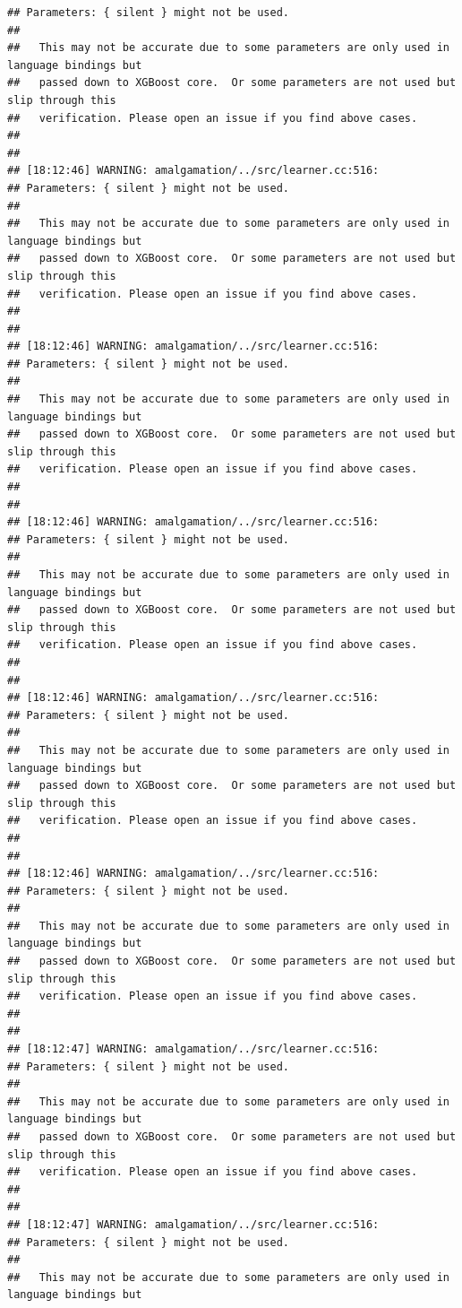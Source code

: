 \documentclass[AMS,STIX2COL]{WileyNJD-v2}\usepackage[]{graphicx}\usepackage[]{color}
\makeatletter
\newenvironment{kframe}{%
 \def\at@end@of@kframe{}%
 \ifinner\ifhmode%
  \def\at@end@of@kframe{\end{minipage}}%
  \begin{minipage}{\columnwidth}%
 \fi\fi%
 \def\FrameCommand##1{\hskip\@totalleftmargin \hskip-\fboxsep
 \colorbox{shadecolor}{##1}\hskip-\fboxsep
     \hskip-\linewidth \hskip-\@totalleftmargin \hskip\columnwidth}%
 \MakeFramed {\advance\hsize-\width
   \@totalleftmargin\z@ \linewidth\hsize
   \@setminipage}}%
 {\par\unskip\endMakeFramed%
 \at@end@of@kframe}
\newenvironment{knitrout}{}{} %
\makeatother
\begin{document}
\begin{knitrout}
\begin{kframe}
\begin{verbatim}
## Parameters: { silent } might not be used.
## 
##   This may not be accurate due to some parameters are only used in language bindings but
##   passed down to XGBoost core.  Or some parameters are not used but slip through this
##   verification. Please open an issue if you find above cases.
## 
## 
## [18:12:46] WARNING: amalgamation/../src/learner.cc:516: 
## Parameters: { silent } might not be used.
## 
##   This may not be accurate due to some parameters are only used in language bindings but
##   passed down to XGBoost core.  Or some parameters are not used but slip through this
##   verification. Please open an issue if you find above cases.
## 
## 
## [18:12:46] WARNING: amalgamation/../src/learner.cc:516: 
## Parameters: { silent } might not be used.
## 
##   This may not be accurate due to some parameters are only used in language bindings but
##   passed down to XGBoost core.  Or some parameters are not used but slip through this
##   verification. Please open an issue if you find above cases.
## 
## 
## [18:12:46] WARNING: amalgamation/../src/learner.cc:516: 
## Parameters: { silent } might not be used.
## 
##   This may not be accurate due to some parameters are only used in language bindings but
##   passed down to XGBoost core.  Or some parameters are not used but slip through this
##   verification. Please open an issue if you find above cases.
## 
## 
## [18:12:46] WARNING: amalgamation/../src/learner.cc:516: 
## Parameters: { silent } might not be used.
## 
##   This may not be accurate due to some parameters are only used in language bindings but
##   passed down to XGBoost core.  Or some parameters are not used but slip through this
##   verification. Please open an issue if you find above cases.
## 
## 
## [18:12:46] WARNING: amalgamation/../src/learner.cc:516: 
## Parameters: { silent } might not be used.
## 
##   This may not be accurate due to some parameters are only used in language bindings but
##   passed down to XGBoost core.  Or some parameters are not used but slip through this
##   verification. Please open an issue if you find above cases.
## 
## 
## [18:12:47] WARNING: amalgamation/../src/learner.cc:516: 
## Parameters: { silent } might not be used.
## 
##   This may not be accurate due to some parameters are only used in language bindings but
##   passed down to XGBoost core.  Or some parameters are not used but slip through this
##   verification. Please open an issue if you find above cases.
## 
## 
## [18:12:47] WARNING: amalgamation/../src/learner.cc:516: 
## Parameters: { silent } might not be used.
## 
##   This may not be accurate due to some parameters are only used in language bindings but

\end{verbatim}
\end{kframe}
\end{knitrout}
\end{document}
